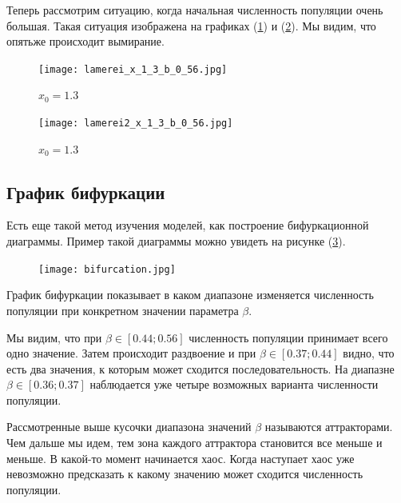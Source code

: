             Теперь рассмотрим ситуацию, когда начальная численность популяции очень большая. Такая ситуация изображена на графиках (\ref{lamerei_x_1_3_b_0_56}) и (\ref{lamerei2_x_1_3_b_0_56}). Мы видим, что опятьже происходит вымирание.
            
            \begin{figure}
                \centering
                \texttt{[image: lamerei\_x\_1\_3\_b\_0\_56.jpg]}
    
                \captionsetup{justification=centering}
                \caption{\(x_0 = 1.3\)}
                \label{lamerei_x_1_3_b_0_56}
            \end{figure}
            
            \begin{figure}
                \centering
                \texttt{[image: lamerei2\_x\_1\_3\_b\_0\_56.jpg]}
    
                \captionsetup{justification=centering}
                \caption{\(x_0 = 1.3\)}
                \label{lamerei2_x_1_3_b_0_56}
            \end{figure}

    \subsection{График бифуркации}

        Есть еще такой метод изучения моделей, как построение бифуркационной диаграммы. Пример такой диаграммы можно увидеть на рисунке (\ref{bifurcation}).

        \begin{figure}
            \centering
            \texttt{[image: bifurcation.jpg]}

            \captionsetup{justification=centering}
            \caption{}
            \label{bifurcation}
        \end{figure}

        График бифуркации показывает в каком диапазоне изменяется численность популяции при конкретном значении параметра \(\beta\).

        Мы видим, что при \(\beta \in [0.44; 0.56]\) численность популяции принимает всего одно значение. Затем происходит раздвоение и при \(\beta \in [0.37; 0.44]\) видно, что есть два значения, к которым может сходится последовательность. На диапазне \(\beta \in [0.36; 0.37]\) наблюдается уже четыре возможных варианта численности популяции. 
        
        Рассмотренные выше кусочки диапазона значений \(\beta\) называются аттракторами. Чем дальше мы идем, тем зона каждого аттрактора становится все меньше и меньше. В какой-то момент начинается хаос. Когда наступает хаос уже невозможно предсказать к какому значению может сходится численность популяции.

